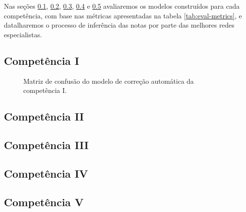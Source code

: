Nas seções \ref{subsec:eval-c1}, \ref{subsec:eval-c2}, \ref{subsec:eval-c3}, \ref{subsec:eval-c4} e \ref{subsec:eval-c5} avaliaremos os modelos construídos para cada competência, com base nas métricas apresentadas na tabela \ref{tab:eval-metrics}, e datalharemos o processo de inferência das notas por parte das melhores redes especialistas.

\subsection{Competência I}
\label{subsec:eval-c1}


\begin{figure}[H]
    \centering
    \resizebox{0.75\textwidth}{!}{}
    \caption{Matriz de confusão do modelo de correção automática da competência I.}
    \label{fig:eval-c1-confusion-matrix}
\end{figure}


\subsection{Competência II}
\label{subsec:eval-c2}


\subsection{Competência III}
\label{subsec:eval-c3}

\subsection{Competência IV}
\label{subsec:eval-c4}

\subsection{Competência V}
\label{subsec:eval-c5}
